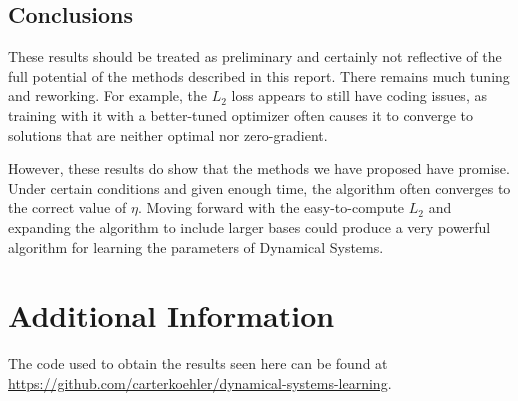 \documentclass[12pt]{article}
\begin{document}
\subsection{Conclusions}

These results should be treated as preliminary and certainly not reflective of the full potential of the methods described in this report. There remains much tuning and reworking. For example, the $L_2$ loss appears to still have coding issues, as training with it with a better-tuned optimizer often causes it to converge to solutions that are neither optimal nor zero-gradient.

However, these results do show that the methods we have proposed have promise. Under certain conditions and given enough time, the algorithm often converges to the correct value of $\eta$. Moving forward with the easy-to-compute $L_2$ and expanding the algorithm to include larger bases could produce a very powerful algorithm for learning the parameters of Dynamical Systems.


\section{Additional Information}

The code used to obtain the results seen here can be found at \url{https://github.com/carterkoehler/dynamical-systems-learning}.





\pagebreak


\end{document}
